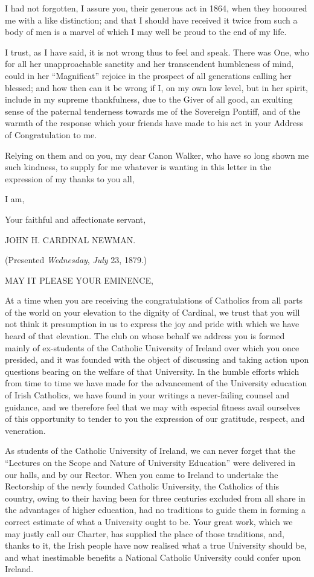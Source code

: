 I had not forgotten, I assure you, their generous act in 1864, when
they honoured me with a like distinction; and that I should have
received it twice from such a body of men is a marvel of which I may
well be proud to the end of my life.

I trust, as I have said, it is not wrong thus to feel and speak.
There was One, who for all her unapproachable sanctity and her
transcendent humbleness of mind, could in her ``Magnificat''
rejoice in the prospect of all generations calling her blessed; and
how then can it be wrong if I, on my own low level, but in her spirit,
include in my supreme thankfulness, due to the Giver of all good, an
exulting sense of the paternal tenderness towards me of the Sovereign
Pontiff, and of the warmth of the response which your friends have
made to his act in your Address of Congratulation to me.

Relying on them and on you, my dear Canon Walker, who have so long
shown me such kindness, to supply for me whatever is wanting in this
letter in the expression of my thanks to you all,

I am,

Your faithful and affectionate servant,

JOHN H. CARDINAL NEWMAN.


(Presented \emph{Wednesday}, \emph{July} 23, 1879.)

MAY IT PLEASE
YOUR EMINENCE,

At a time when you are receiving the congratulations of Catholics
from all parts of the world on your elevation to the dignity of
Cardinal, we trust that you will not think it presumption in us to
express the joy and pride with which we have heard of that elevation.
The club on whose behalf we address you is formed mainly of
ex-students of the Catholic University of Ireland over which you once
presided, and it was founded with the object of discussing and taking
action upon questions bearing on the welfare of that University. In
the humble efforts which from time to time we have made for the
advancement of the University education of Irish Catholics, we have
found in your writings a never-failing counsel and guidance, and we
therefore feel that we may with especial fitness avail ourselves of
this opportunity to tender to you the expression of our gratitude,
respect, and veneration.

As students of the Catholic University of Ireland, we can never
forget that the ``Lectures on the Scope and Nature of University
Education'' were delivered in our halls, and by our Rector. When
you came to Ireland to undertake the Rectorship of the newly founded
Catholic University, the Catholics of this country, owing to their
having been for three centuries excluded from all share in the
advantages of higher education, had no traditions to guide them in
forming a correct estimate of what a University ought to be.
Your great work, which we may justly call our Charter, has supplied
the place of those traditions, and, thanks to it, the Irish people
have now realised what a true University should be, and what
inestimable benefits a National Catholic University could confer upon
Ireland.

